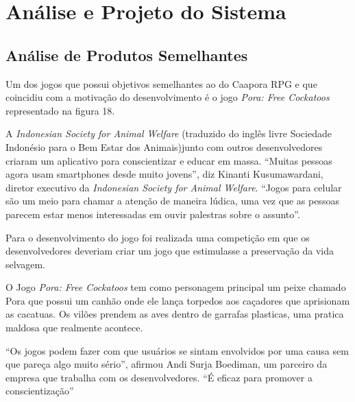 \chapter{Análise e Projeto do Sistema}
\label{chap:Analise-e-levantamento-de-requisitos}

\section{Análise de Produtos Semelhantes}
\label{sec:analise-de-produtos-semelhantes}

Um dos jogos que possui objetivos semelhantes ao do Caapora RPG e que coincidiu com a motivação do desenvolvimento é o jogo \textit{Pora: Free Cockatoos} representado na figura 18.

A \textit{Indonesian Society for Animal Welfare} (traduzido do inglês livre Sociedade Indonésio para o Bem Estar dos Animais)junto com outros desenvolvedores
criaram um aplicativo para conscientizar e educar em massa. “Muitas pessoas agora usam smartphones desde muito jovens”, diz Kinanti Kusumawardani, diretor executivo da \textit{Indonesian Society for Animal Welfare}. “Jogos para celular são um meio para chamar a atenção de maneira lúdica, uma vez que as pessoas parecem estar menos interessadas em ouvir palestras sobre o assunto”.

Para o desenvolvimento do jogo foi realizada uma competição em que os desenvolvedores deveriam criar um jogo que estimulasse a preservação da vida selvagem.

O Jogo \textit{Pora: Free Cockatoos} tem como personagem principal um peixe chamado Pora que possui um canhão onde ele lança torpedos aos caçadores que aprisionam as cacatuas.
Os vilões prendem as aves dentro de garrafas plasticas, uma pratica maldosa que realmente acontece.

“Os jogos podem fazer com que usuários se sintam envolvidos por uma causa sem que pareça algo muito sério”, afirmou Andi Surja Boediman, um parceiro da empresa que trabalha com os desenvolvedores. “É eficaz para promover a conscientização” \cite{anda}

\begin{figure}[h!]
		\centering
	\end{figure}
\pagebreak
